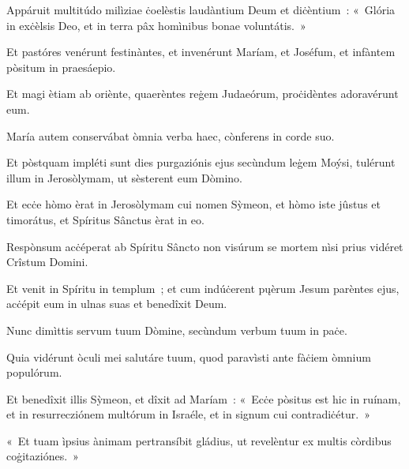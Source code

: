 Appáruit multitúdo milìziae ċoelèstis laudàntium Deum et diċèntium~: «~Glória in exċèlsis Deo, et in terra pâx homìnibus bonae voluntátis.~» 

Et pastóres venérunt festinàntes, et invenérunt Maríam, et Joséfum, et infàntem pòsitum in praesáepio. 

Et magi ètiam ab oriènte, quaerèntes reġem Judaeórum, proċidèntes adoravérunt eum. 

María autem conservábat òmnia verba haec, cònferens in corde suo. 

\mysteryEnd
{}

Et pòstquam impléti sunt dies purgaziónis ejus secùndum leġem Moýsi, tulérunt illum in Jerosòlymam, ut sèsterent eum Dòmino. 

Et ecċe hòmo èrat in Jerosòlymam cui nomen Sỳmeon, et hòmo iste jûstus et timorátus, et Spíritus Sânctus èrat in eo. 

Respònsum acċéperat ab Spíritu Sâncto non visúrum se mortem nìsi prius vidéret Crîstum Domini. 

Et venit in Spíritu in templum~; et cum indúċerent pųèrum Jesum parèntes ejus, acċépit eum in ulnas suas et benedîxit Deum. 

Nunc dimìttis servum tuum Dòmine, secùndum verbum tuum in paċe. 

Quia vidérunt òculi mei salutáre tuum, quod paravìsti ante fàċiem òmnium populórum. 

Et benedîxit illis Sỳmeon, et dîxit ad Maríam~: «~Ecċe pòsitus est hic in ruínam, et in resurrecziónem multórum in Israéle, et in signum cui contradiċétur.~» 

«~Et tuam ìpsius ànimam pertransíbit gládius, ut revelèntur ex multis còrdibus coġitaziónes.~» 

